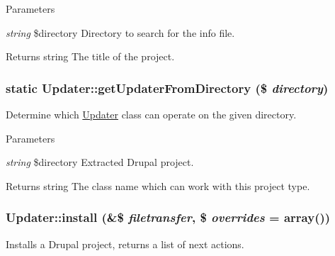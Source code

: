 \begin{DoxyParams}{Parameters}
\item[{\em string}]\$directory Directory to search for the info file.\end{DoxyParams}
\begin{DoxyReturn}{Returns}
string The title of the project. 
\end{DoxyReturn}
\hypertarget{classUpdater_a84f76400d1eb8fc288c6544028044e11}{
\subsubsection[{getUpdaterFromDirectory}]{\setlength{\rightskip}{0pt plus 5cm}static Updater::getUpdaterFromDirectory (\$ {\em directory})}}
\label{classUpdater_a84f76400d1eb8fc288c6544028044e11}
Determine which \hyperlink{classUpdater}{Updater} class can operate on the given directory.


\begin{DoxyParams}{Parameters}
\item[{\em string}]\$directory Extracted Drupal project.\end{DoxyParams}
\begin{DoxyReturn}{Returns}
string The class name which can work with this project type. 
\end{DoxyReturn}
\hypertarget{classUpdater_ae48337676acbe63592adf17ed629c72a}{
\subsubsection[{install}]{\setlength{\rightskip}{0pt plus 5cm}Updater::install (\&\$ {\em filetransfer}, \/  \$ {\em overrides} = {\ttfamily array()})}}
\label{classUpdater_ae48337676acbe63592adf17ed629c72a}
Installs a Drupal project, returns a list of next actions.



